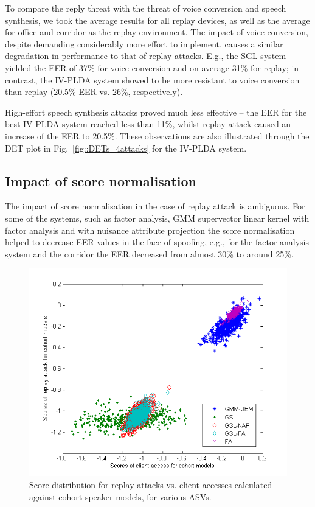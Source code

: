 To compare the reply threat with the threat of voice conversion and speech synthesis, we took the average results for all replay devices, as well as the average for office and corridor as the replay environment.
The impact of voice conversion, despite demanding considerably more effort to implement, causes a similar degradation in performance to that of replay attacks. E.g., the SGL system yielded the EER of 37\% for voice conversion and on average 31\% for replay; in contrast, the IV-PLDA system showed to be more resistant to voice conversion than replay (20.5\% EER vs. 26\%, respectively). 

High-effort speech synthesis attacks proved much less effective -- the EER for the best IV-PLDA system reached less than 11\%, whilst replay attack caused an increase of the EER to 20.5\%. These observations are also illustrated through the DET plot in Fig.~\ref{fig::DETs_4attacks} for the IV-PLDA system.




\subsection{Impact of score normalisation}

The impact of score normalisation in the case of replay attack is ambiguous.  For some of the systems, such as factor analysis, GMM supervector linear kernel with factor analysis and with nuisance attribute projection the score normalisation helped to decrease EER values in the face of spoofing, e.g., for the factor analysis system and the corridor the EER decreased from almost 30\% to around 25\%. 

\begin{figure}
	\includegraphics[width=1\linewidth]{Figs/Scores_cohort.png}

	\caption{Score distribution for replay attacks vs. client accesses calculated against cohort speaker models, for various ASVs.}
	\label{fig::Scores_cohort}
\end{figure}

